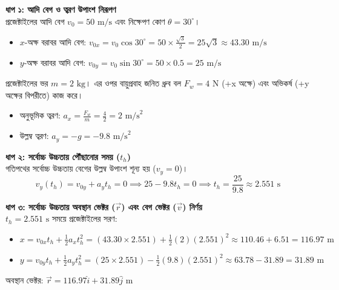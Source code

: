 \documentclass[12pt, a4paper]{article}
\begin{document}
\begin{tcolorbox}[solutionbox={সমাধান (Solution)}]
\noindent
\textbf{ধাপ ১: আদি বেগ ও ত্বরণ উপাংশ নিরূপণ} \\
প্রজেক্টাইলের আদি বেগ $v_0 = 50\text{ m/s}$ এবং নিক্ষেপণ কোণ $\theta = 30^\circ$।
\begin{itemize}[leftmargin=*, parsep=0.5ex]
    \item $x$-অক্ষ বরাবর আদি বেগ: $v_{0x} = v_0 \cos 30^\circ = 50 \times \frac{\sqrt{3}}{2} = 25\sqrt{3} \approx 43.30\text{ m/s}$
    \item $y$-অক্ষ বরাবর আদি বেগ: $v_{0y} = v_0 \sin 30^\circ = 50 \times 0.5 = 25\text{ m/s}$
\end{itemize}
প্রজেক্টাইলের ভর $m = 2\text{ kg}$। এর ওপর বায়ুপ্রবাহ জনিত ধ্রুব বল $F_w = 4\text{ N}$ (+x অক্ষে) এবং অভিকর্ষ (+y অক্ষের বিপরীতে) কাজ করে।
\begin{itemize}[leftmargin=*, parsep=0.5ex]
    \item অনুভূমিক ত্বরণ: $a_x = \frac{F_w}{m} = \frac{4}{2} = 2\text{ m/s}^2$
    \item উল্লম্ব ত্বরণ: $a_y = -g = -9.8\text{ m/s}^2$
\end{itemize}

\vspace{0.5em}
\noindent
\textbf{ধাপ ২: সর্বোচ্চ উচ্চতায় পৌঁছানোর সময় ($t_h$)} \\
গতিপথের সর্বোচ্চ উচ্চতায় বেগের উল্লম্ব উপাংশ শূন্য হয় ($v_y = 0$)।
\[ v_y(t_h) = v_{0y} + a_y t_h = 0 \implies 25 - 9.8 t_h = 0 \implies t_h = \frac{25}{9.8} \approx 2.551\text{ s} \]

\vspace{0.5em}
\noindent
\textbf{ধাপ ৩: সর্বোচ্চ উচ্চতায় অবস্থান ভেক্টর ($\vec{r}$) এবং বেগ ভেক্টর ($\vec{v}$) নির্ণয়} \\
$t_h = 2.551\text{ s}$ সময়ে প্রজেক্টাইলের সরণ:
\begin{itemize}[leftmargin=*, parsep=0.5ex]
    \item $x = v_{0x} t_h + \frac{1}{2} a_x t_h^2 = (43.30 \times 2.551) + \frac{1}{2} (2) (2.551)^2 \approx 110.46 + 6.51 = 116.97\text{ m}$
    \item $y = v_{0y} t_h + \frac{1}{2} a_y t_h^2 = (25 \times 2.551) - \frac{1}{2} (9.8) (2.551)^2 \approx 63.78 - 31.89 = 31.89\text{ m}$
\end{itemize}
অবস্থান ভেক্টর: $\vec{r} = 116.97\hat{i} + 31.89\hat{j} \text{ m}$


\end{tcolorbox}
\end{document}
